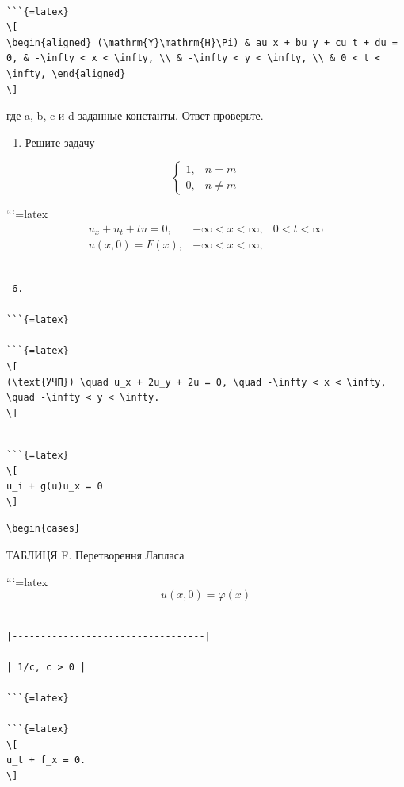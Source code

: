 \documentclass[
]{article}
\providecommand{\tightlist}{%
  \setlength{\itemsep}{0pt}\setlength{\parskip}{0pt}}
\begin{document}
\begin{verbatim}

```{=latex}
\[
\begin{aligned} (\mathrm{Y}\mathrm{H}\Pi) & au_x + bu_y + cu_t + du = 0, & -\infty < x < \infty, \\ & -\infty < y < \infty, \\ & 0 < t < \infty, \end{aligned}
\]
\end{verbatim}

где a, b, c и d-заданные константы. Ответ проверьте.

\begin{enumerate}
\def\labelenumi{\arabic{enumi}.}
\setcounter{enumi}{3}
\tightlist
\item
  Решите задачу
\end{enumerate}

\[
\begin{cases} 1, & n=m \\ 0, & n\neq m \end{cases}
\]

```{=latex}
\[
\begin{aligned} u_x + u_t + tu = 0, & -\infty < x < \infty, & 0 < t < \infty \\ u(x, 0) = F(x), & -\infty < x < \infty, & \end{aligned}
\]

\begin{verbatim}

 6.

```{=latex}

```{=latex}
\[
(\text{УЧП}) \quad u_x + 2u_y + 2u = 0, \quad -\infty < x < \infty, \quad -\infty < y < \infty.
\]
\end{verbatim}

\begin{verbatim}

```{=latex}
\[
u_i + g(u)u_x = 0
\]
\end{verbatim}

\begin{verbatim}
\begin{cases}
\end{verbatim}

ТАБЛИЦЯ F. Перетворення Лапласа

```{=latex}
\[
u(x, 0) = \varphi(x)
\]

\begin{verbatim}

|----------------------------------|

| 1/с, с > 0 |

```{=latex}

```{=latex}
\[
u_t + f_x = 0.
\]
\end{verbatim}
\end{document}
